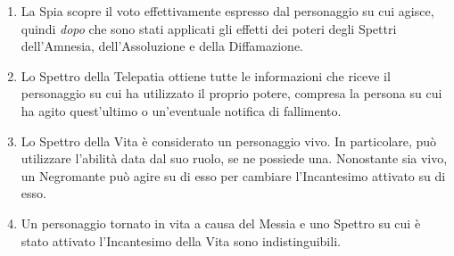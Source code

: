 \documentclass[a4paper,10pt]{article}
\begin{document}
\begin{enumerate}
	\item La Spia scopre il voto effettivamente espresso dal personaggio su cui agisce, quindi \emph{dopo} che sono stati applicati gli effetti dei poteri degli Spettri dell'Amnesia, dell'Assoluzione e della Diffamazione.
	
	\item Lo Spettro della Telepatia ottiene tutte le informazioni che riceve il personaggio su cui ha utilizzato il proprio potere, compresa la persona su cui ha agito quest'ultimo o un'eventuale notifica di fallimento.
	
	\item Lo Spettro della Vita è considerato un personaggio vivo. In particolare, può utilizzare l'abilità data dal suo ruolo, se ne possiede una. Nonostante sia vivo, un Negromante può agire su di esso per cambiare l'Incantesimo attivato su di esso.
	
	\item Un personaggio tornato in vita a causa del Messia e uno Spettro su cui è stato attivato l'Incantesimo della Vita sono indistinguibili.
	

\end{enumerate}
\end{document}
